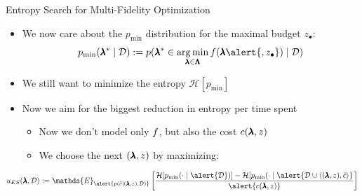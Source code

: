 \begin{frame}[c]{Entropy Search for Multi-Fidelity Optimization }

\begin{itemize}
		\item We now care about the $p_{\text{min}}$ distribution for the maximal budget $z_{\bullet}$:
		$$p_{\text{min}}(\conf^* \mid \dataset) := p(\conf^* \in \argmin_{\conf\in \pcs} \func(\conf\alert{,z_{\bullet}}) \mid \dataset)$$
	
		\item We still want to minimize the entropy $\mathcal{H}[p_\text{min}]$
\pause
\medskip
		\item Now we aim for the biggest \alert{reduction in entropy per time spent}
		\begin{itemize}
			\item Now we don't model only $f$, but also \alert{the cost $c(\pmb{\lambda},z)$}
			\item We choose the next $(\pmb{\lambda},z)$ by maximizing:
		\end{itemize}
\end{itemize}
\vspace*{0.5cm}
	\[{\acq}_{ES}(\conf,\dataset) := \mathds{E}_{\alert{p(\tilde{\cost}\mid (\conf, z), \dataset)}} 
	\left[   \frac{\mathcal{H}[p_{\text{min}}(\cdot \mid \alert{\dataset})] - \mathcal{H}[p_{\text{min}}(\cdot \mid \alert{\dataset \cup \left\langle (\conf,z), \tilde{\cost} \right\rangle}}{\alert{c(\conf,z)}} \right]\]


\end{frame}

